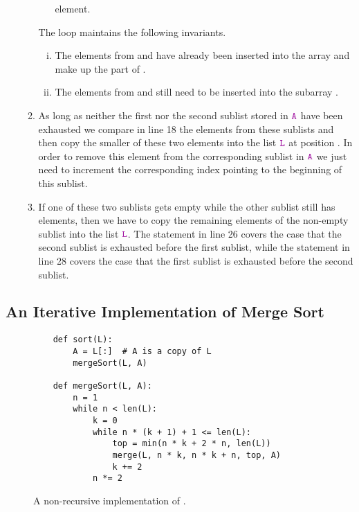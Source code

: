 \begin{enumerate}
\begin{enumerate}
\begin{itemize}
                  element.
            \end{itemize}
            The  loop maintains the following invariants.
            \begin{enumerate}[(i)]
            \item The elements from  and  have already been inserted
                  into the array  and make up the part  of .
            \item The elements from  and  still need to be inserted into
                  the subarray .
            \end{enumerate}
      \item As long as neither the first nor the second sublist stored in $\mytt{A}$ have been exhausted
            we compare in line 18 the elements from these sublists and then copy the smaller of these
            two elements into the list $\mytt{L}$ at position .
            In order to remove this element from the corresponding sublist in $\mytt{A}$ we just need to
            increment the corresponding index pointing to the beginning of this sublist.
      \item If one of these two sublists gets empty while the other sublist still has elements, then we have
            to copy the remaining elements of the non-empty sublist into the list $\mytt{L}$.
            The statement in line 26 covers the case that the second sublist is exhausted before 
            the first sublist, while the statement in line 28 covers the case that the first
            sublist is exhausted before the second sublist.
      \end{enumerate}
\end{enumerate}

\subsection{An Iterative Implementation of Merge Sort}

\begin{figure}[!ht]
  \centering
\begin{verbatim}
    def sort(L):
        A = L[:]  # A is a copy of L
        mergeSort(L, A)

    def mergeSort(L, A):
        n = 1
        while n < len(L):
            k = 0
            while n * (k + 1) + 1 <= len(L):
                top = min(n * k + 2 * n, len(L))
                merge(L, n * k, n * k + n, top, A)
                k += 2    
            n *= 2 
\end{verbatim}
\vspace*{-0.3cm}
  \caption{A non-recursive implementation of .}
  \label{fig:merge-sort-nr.stlx}
\end{figure}

